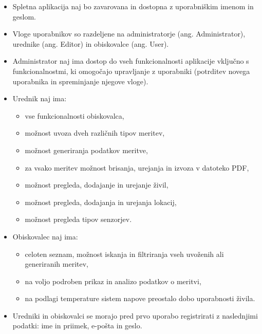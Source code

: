 \documentclass[a4paper, 12pt]{book}
\begin{document}
\begin{itemize}
\item Spletna aplikacija naj bo zavarovana in dostopna z uporabniškim imenom in geslom.

\item Vloge uporabnikov so razdeljene na administratorje (ang. Administrator), urednike (ang. Editor) in obiskovalce (ang. User).  

\item Administrator naj ima dostop do vseh funkcionalnosti aplikacije vključno s funkcionalnostmi, ki omogočajo upravljanje z uporabniki (potrditev novega uporabnika in spreminjanje njegove vloge).

\item Urednik naj ima:
	\begin{itemize}
		\item vse funkcionalnosti obiskovalca,
		
		\item možnost uvoza dveh različnih tipov meritev,

		\item možnost generiranja podatkov meritve,

		\item za vsako meritev možnost brisanja, urejanja in izvoza v datoteko PDF,

		\item možnost pregleda, dodajanje in urejanje živil,

		\item možnost pregleda, dodajanja in urejanja lokacij,

		\item možnost pregleda tipov senzorjev.
	\end{itemize}

\item Obiskovalec naj ima:
	\begin{itemize}
		\item celoten seznam, možnost iskanja in filtriranja vseh uvoženih ali generiranih meritev,
		
		\item na voljo podroben prikaz in analizo podatkov o meritvi,
		
		\item na podlagi temperature sistem napove preostalo dobo uporabnosti živila.
	\end{itemize}
	
\item Uredniki in obiskovalci se morajo pred prvo uporabo registrirati z naslednjimi podatki: ime in priimek, e-pošta in geslo.


\end{itemize}
\end{document}
